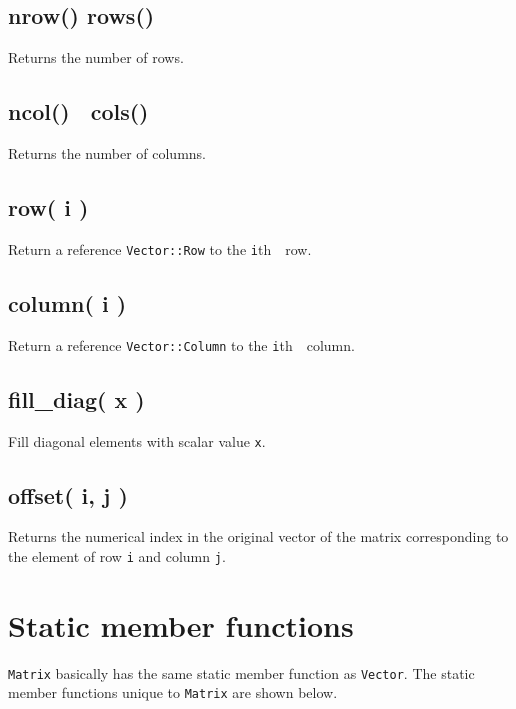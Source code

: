 \documentclass[]{book}
\begin{document}
\hypertarget{nrow-rows}{%
\subsection{nrow() rows()}\label{nrow-rows}}

Returns the number of rows.

\hypertarget{ncolcols}{%
\subsection{ncol()　cols()}\label{ncolcols}}

Returns the number of columns.

\hypertarget{row-i}{%
\subsection{row( i )}\label{row-i}}

Return a reference \texttt{Vector::Row} to the \texttt{i}th　row.

\hypertarget{column-i}{%
\subsection{column( i )}\label{column-i}}

Return a reference \texttt{Vector::Column} to the \texttt{i}th　column.

\hypertarget{fill_diag-x}{%
\subsection{fill\_diag( x )}\label{fill_diag-x}}

Fill diagonal elements with scalar value \texttt{x}.

\hypertarget{offset-i-j}{%
\subsection{offset( i, j )}\label{offset-i-j}}

Returns the numerical index in the original vector of the matrix corresponding to the element of row \texttt{i} and column \texttt{j}.

\hypertarget{static-member-functions-1}{%
\section{Static member functions}\label{static-member-functions-1}}

\texttt{Matrix} basically has the same static member function as \texttt{Vector}. The static member functions unique to \texttt{Matrix} are shown below.
\end{document}
